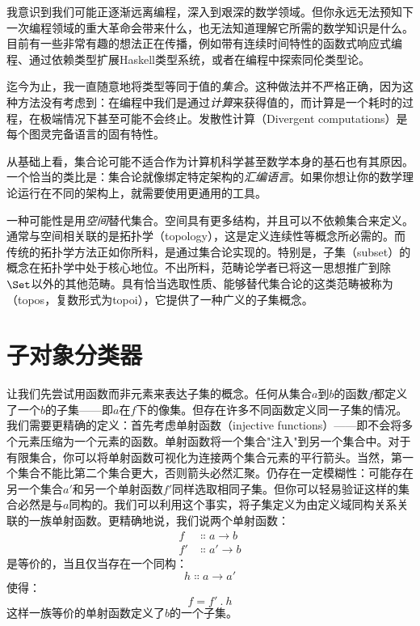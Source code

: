 
\lettrine[lhang=0.17]{我}{意识到我们可能正逐渐远离编程}，深入到艰深的数学领域。但你永远无法预知下一次编程领域的重大革命会带来什么，也无法知道理解它所需的数学知识是什么。目前有一些非常有趣的想法正在传播，例如带有连续时间特性的函数式响应式编程、通过依赖类型扩展Haskell类型系统，或者在编程中探索同伦类型论。

迄今为止，我一直随意地将类型等同于值的\emph{集合}。这种做法并不严格正确，因为这种方法没有考虑到：在编程中我们是通过\emph{计算}来获得值的，而计算是一个耗时的过程，在极端情况下甚至可能不会终止。发散性计算（Divergent computations）是每个图灵完备语言的固有特性。

从基础上看，集合论可能不适合作为计算机科学甚至数学本身的基石也有其原因。一个恰当的类比是：集合论就像绑定特定架构的\emph{汇编语言}。如果你想让你的数学理论运行在不同的架构上，就需要使用更通用的工具。

一种可能性是用\emph{空间}替代集合。空间具有更多结构，并且可以不依赖集合来定义。通常与空间相关联的是拓扑学（topology），这是定义连续性等概念所必需的。而传统的拓扑学方法正如你所料，是通过集合论实现的。特别是，子集（subset）的概念在拓扑学中处于核心地位。不出所料，范畴论学者已将这一思想推广到除$\Set$以外的其他范畴。具有恰当选取性质、能够替代集合论的这类范畴被称为（topos，复数形式为topoi），它提供了一种广义的子集概念。

\section{子对象分类器}

让我们先尝试用函数而非元素来表达子集的概念。任何从集合$a$到$b$的函数$f$都定义了一个$b$的子集——即$a$在$f$下的像集。但存在许多不同函数定义同一子集的情况。我们需要更精确的定义：首先考虑单射函数（injective functions）——即不会将多个元素压缩为一个元素的函数。单射函数将一个集合"注入"到另一个集合中。对于有限集合，你可以将单射函数可视化为连接两个集合元素的平行箭头。当然，第一个集合不能比第二个集合更大，否则箭头必然汇聚。仍存在一定模糊性：可能存在另一个集合$a'$和另一个单射函数$f'$同样选取相同子集。但你可以轻易验证这样的集合必然是与$a$同构的。我们可以利用这个事实，将子集定义为由定义域同构关系关联的一族单射函数。更精确地说，我们说两个单射函数：
\begin{align*}
  f  & \Colon a \to b  \\
  f' & \Colon a' \to b
\end{align*}
是等价的，当且仅当存在一个同构：
$$h \Colon a \to a'$$
使得：
$$f = f'\ .\ h$$
这样一族等价的单射函数定义了$b$的一个子集。

